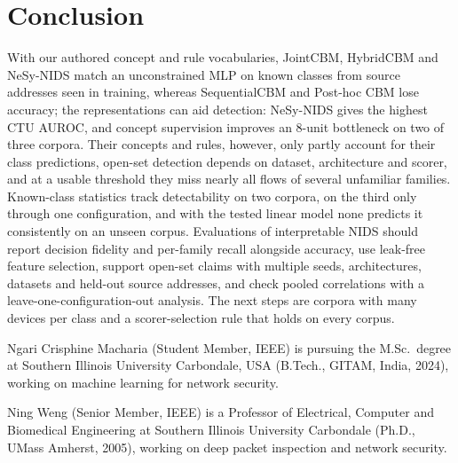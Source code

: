 \documentclass[journal]{IEEEtran}
\begin{document}
\section{Conclusion}\label{sec:conclusion}

With our authored concept and rule vocabularies, JointCBM, HybridCBM and NeSy-NIDS match an unconstrained MLP on known classes from source addresses seen in training, whereas SequentialCBM and Post-hoc CBM lose accuracy; the representations can aid detection: NeSy-NIDS gives the highest CTU AUROC, and concept supervision improves an 8-unit bottleneck on two of three corpora. Their concepts and rules, however, only partly account for their class predictions, open-set detection depends on dataset, architecture and scorer, and at a usable threshold they miss nearly all flows of several unfamiliar families. Known-class statistics track detectability on two corpora, on the third only through one configuration, and with the tested linear model none predicts it consistently on an unseen corpus. Evaluations of interpretable NIDS should report decision fidelity and per-family recall alongside accuracy, use leak-free feature selection, support open-set claims with multiple seeds, architectures, datasets and held-out source addresses, and check pooled correlations with a leave-one-configuration-out analysis. The next steps are corpora with many devices per class and a scorer-selection rule that holds on every corpus.





\begin{IEEEbiographynophoto}{Ngari Crisphine Macharia}
(Student Member, IEEE) is pursuing the M.Sc.\ degree at Southern Illinois University
Carbondale, USA (B.Tech., GITAM, India, 2024), working on machine learning for network
security.
\end{IEEEbiographynophoto}

\begin{IEEEbiographynophoto}{Ning Weng}
(Senior Member, IEEE) is a Professor of Electrical, Computer and Biomedical Engineering at
Southern Illinois University Carbondale (Ph.D., UMass Amherst, 2005), working on deep
packet inspection and network security.
\end{IEEEbiographynophoto}
\end{document}
